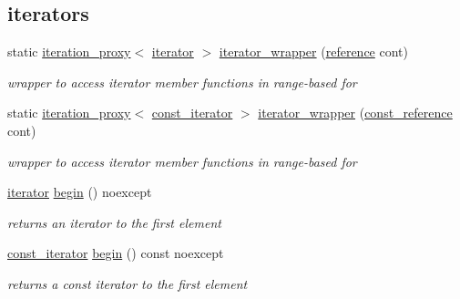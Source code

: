\subsection*{iterators}
\begin{DoxyCompactItemize}
\item 
static \mbox{\hyperlink{classnlohmann_1_1detail_1_1iteration__proxy}{iteration\+\_\+proxy}}$<$ \mbox{\hyperlink{classnlohmann_1_1basic__json_a099316232c76c034030a38faa6e34dca}{iterator}} $>$ \mbox{\hyperlink{classnlohmann_1_1basic__json_aea8c06bb8e632f14cd77632519213d75}{iterator\+\_\+wrapper}} (\mbox{\hyperlink{classnlohmann_1_1basic__json_ac6a5eddd156c776ac75ff54cfe54a5bc}{reference}} cont)
\begin{DoxyCompactList}\small\item\em wrapper to access iterator member functions in range-\/based for \end{DoxyCompactList}\item 
static \mbox{\hyperlink{classnlohmann_1_1detail_1_1iteration__proxy}{iteration\+\_\+proxy}}$<$ \mbox{\hyperlink{classnlohmann_1_1basic__json_a41a70cf9993951836d129bb1c2b3126a}{const\+\_\+iterator}} $>$ \mbox{\hyperlink{classnlohmann_1_1basic__json_adb4db7abbc5ba12c9273f032a7b89198}{iterator\+\_\+wrapper}} (\mbox{\hyperlink{classnlohmann_1_1basic__json_a4057c5425f4faacfe39a8046871786ca}{const\+\_\+reference}} cont)
\begin{DoxyCompactList}\small\item\em wrapper to access iterator member functions in range-\/based for \end{DoxyCompactList}\item 
\mbox{\hyperlink{classnlohmann_1_1basic__json_a099316232c76c034030a38faa6e34dca}{iterator}} \mbox{\hyperlink{classnlohmann_1_1basic__json_a0ff28dac23f2bdecee9564d07f51dcdc}{begin}} () noexcept
\begin{DoxyCompactList}\small\item\em returns an iterator to the first element \end{DoxyCompactList}\item 
\mbox{\hyperlink{classnlohmann_1_1basic__json_a41a70cf9993951836d129bb1c2b3126a}{const\+\_\+iterator}} \mbox{\hyperlink{classnlohmann_1_1basic__json_a4f0f5dd42b2987ff20306ed78bd31d1d}{begin}} () const noexcept
\begin{DoxyCompactList}\small\item\em returns a const iterator to the first element \end{DoxyCompactList}\item 

\end{DoxyCompactItemize}

